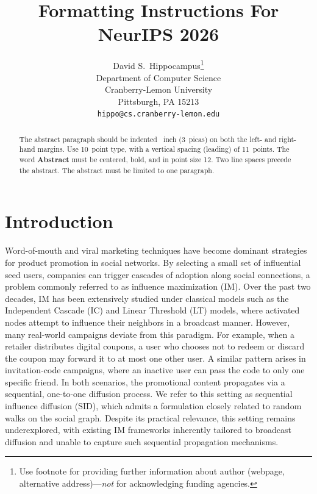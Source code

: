 \documentclass{article}
\title{Formatting Instructions For NeurIPS 2026}
\author{%
  David S.~Hippocampus\thanks{Use footnote for providing further information
    about author (webpage, alternative address)---\emph{not} for acknowledging
    funding agencies.} \\
  Department of Computer Science\\
  Cranberry-Lemon University\\
  Pittsburgh, PA 15213 \\
  \texttt{hippo@cs.cranberry-lemon.edu} \\
}
\begin{document}
\maketitle


\begin{abstract}
  The abstract paragraph should be indented ~inch (3~picas) on both the left- and right-hand margins. Use 10~point type, with a vertical spacing (leading) of 11~points. The word \textbf{Abstract} must be centered, bold, and in point size 12. Two line spaces precede the abstract. The abstract must be limited to one paragraph.
\end{abstract}



\section{Introduction}

Word-of-mouth and viral marketing techniques have become dominant strategies for product promotion in social networks. By selecting a small set of influential seed users, companies can trigger cascades of adoption along social connections, a problem commonly referred to as influence maximization (IM). Over the past two decades, IM has been extensively studied under classical models such as the Independent Cascade (IC) and Linear Threshold (LT) models, where activated nodes attempt to influence their neighbors in a broadcast manner. However, many real-world campaigns deviate from this paradigm. For example, when a retailer distributes digital coupons, a user who chooses not to redeem or discard the coupon may forward it to at most one other user. A similar pattern arises in invitation-code campaigns, where an inactive user can pass the code to only one specific friend. In both scenarios, the promotional content propagates via a sequential, one-to-one diffusion process. We refer to this setting as sequential influence diffusion (SID), which admits a formulation closely related to random walks on the social graph. Despite its practical relevance, this setting remains underexplored, with existing IM frameworks inherently tailored to broadcast diffusion and unable to capture such sequential propagation mechanisms.
\end{document}
